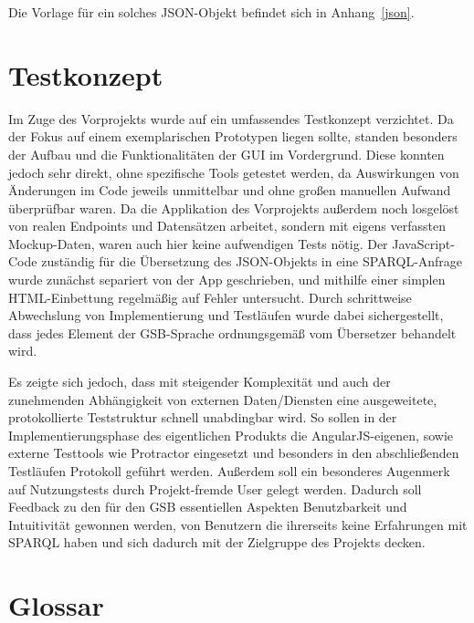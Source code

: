 Die Vorlage für ein solches JSON-Objekt befindet sich in Anhang~\ref{json}.

\section{Testkonzept}

Im Zuge des Vorprojekts wurde auf ein umfassendes Testkonzept
verzichtet.
Da der Fokus auf einem exemplarischen Prototypen liegen
sollte, standen besonders der Aufbau und die Funktionalitäten der GUI
im Vordergrund.
Diese konnten jedoch sehr direkt, ohne spezifische
Tools getestet werden, da Auswirkungen von Änderungen im Code jeweils
unmittelbar und ohne großen manuellen Aufwand überprüfbar waren.
Da die Applikation des Vorprojekts außerdem noch losgelöst von realen Endpoints und Datensätzen arbeitet, sondern mit eigens verfassten Mockup-Daten, waren auch hier keine aufwendigen Tests nötig.
Der JavaScript-Code zuständig für die Übersetzung des JSON-Objekts in
eine SPARQL-Anfrage wurde zunächst separiert von der App geschrieben,
und mithilfe einer simplen HTML-Einbettung regelmäßig auf Fehler
untersucht.
Durch schrittweise Abwechslung von Implementierung und Testläufen wurde dabei sichergestellt, dass jedes Element der GSB-Sprache ordnungsgemäß vom Übersetzer behandelt wird.

Es zeigte sich jedoch, dass mit steigender Komplexität und auch der
zunehmenden Abhängigkeit von externen Daten/Diensten eine
ausgeweitete, protokollierte Teststruktur schnell unabdingbar wird.
So
sollen in der Implementierungsphase des eigentlichen Produkts die
AngularJS-eigenen, sowie externe Testtools wie Protractor eingesetzt
und besonders in den abschließenden Testläufen Protokoll geführt
werden.
Außerdem soll ein besonderes Augenmerk auf Nutzungstests durch
Projekt-fremde User gelegt werden. Dadurch soll Feedback zu den für
den GSB essentiellen Aspekten Benutzbarkeit und Intuitivität gewonnen
werden, von Benutzern die ihrerseits keine Erfahrungen mit SPARQL
haben und sich dadurch mit der Zielgruppe des Projekts decken.

\section{Glossar}

\newcommand{\begriff}[2]{%
\paragraph{#1}
#2%
\vspace*{-.5\baselineskip}
}

